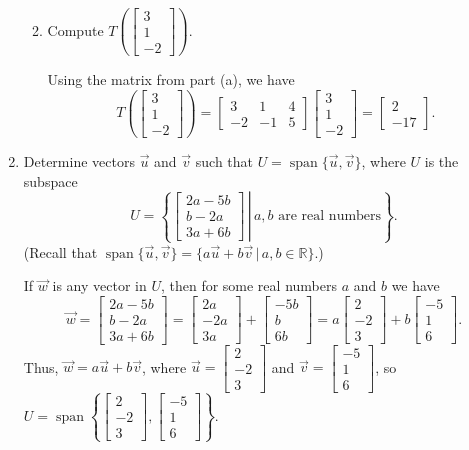 \documentclass[12pt]{article}
\newcommand{\points}[1]{\marginpar{\hspace{24pt}[#1]}}
\newcommand{\R}{\mathbb{R}}
\newcommand{\bbm}{\begin{bmatrix}}
\newcommand{\ebm}{\end{bmatrix}}
\begin{document}
\begin{enumerate}
\begin{enumerate}
\medskip

 \item Compute $T\left(\bbm 3\\1\\-2\ebm\right)$. \points{3}

\bigskip

Using the matrix from part (a), we have
\[
 T\left(\bbm 3\\1\\-2\ebm\right) = \bbm 3&1&4\\-2&-1&5\ebm\bbm 3\\1\\-2\ebm = \bbm 2\\-17\ebm.
\]
\end{enumerate}

\newpage

\item Determine vectors $\vec{u}$ and $\vec{v}$ such that $U=\operatorname{span}\{\vec{u},\vec{v}\}$, where $U$ is the subspace \points{4}
\[
 U = \left\{\left.\bbm 2a-5b\\b-2a\\3a+6b\ebm \,\right|\, a,b \text{ are real numbers}\right\}.
\]
(Recall that $\operatorname{span}\{\vec{u},\vec{v}\} = \{a\vec{u}+b\vec{v}\,|\, a,b\in\R\}$.)

\bigskip

If $\vec{w}$ is any vector in $U$, then for some real numbers $a$ and $b$ we have
\[
 \vec{w} = \bbm 2a-5b\\b-2a\\3a+6b\ebm = \bbm 2a\\-2a\\3a\ebm + \bbm -5b\\b\\6b\ebm = a\bbm 2\\-2\\3\ebm + b\bbm -5\\1\\6\ebm.
\]
Thus, $\vec{w} = a\vec{u}+b\vec{v}$, where $\vec{u} =\bbm 2\\-2\\3\ebm$ and $\vec{v} = \bbm -5\\1\\6\ebm$, so $U=\operatorname{span}\left\{\bbm 2\\-2\\3\ebm,\bbm -5\\1\\6\ebm\right\}$.

\bigskip


\end{enumerate}
\end{document}
